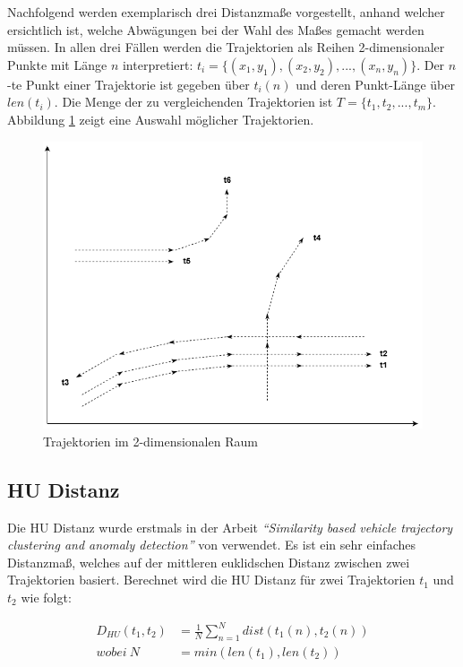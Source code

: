 
Nachfolgend werden exemplarisch drei Distanzmaße vorgestellt, anhand welcher ersichtlich ist, welche Abwägungen
bei der Wahl des Maßes gemacht werden müssen.
In allen drei Fällen werden die Trajektorien als Reihen 2-dimensionaler Punkte mit Länge $n$ interpretiert: $t_i = \{(x_1, y_1), (x_2, y_2), ..., (x_n, y_n)\}$.
Der $n$-te Punkt einer Trajektorie ist gegeben über $t_i(n)$ und deren Punkt-Länge über $len(t_i)$.
Die Menge der zu vergleichenden Trajektorien ist $T = \{t_1, t_2, ..., t_m\}$.
Abbildung \ref{fig:grund_trajectories} zeigt eine Auswahl möglicher Trajektorien.

\begin{figure}[H]
\centering
\includegraphics[width=0.6\linewidth]{resources/img/grundlagen/trajectories}
\caption{Trajektorien im 2-dimensionalen Raum}
\label{fig:grund_trajectories}
\end{figure}

\subsection{HU Distanz}
\label{sec:hu_distance}

Die HU Distanz wurde erstmals in der Arbeit \textit{``Similarity based vehicle trajectory clustering and anomaly detection''}
von \cite[]{Hu2005} verwendet. Es ist ein sehr einfaches Distanzmaß, welches auf der mittleren euklidschen Distanz
zwischen zwei Trajektorien basiert. Berechnet wird die HU Distanz für zwei Trajektorien $t_1$ und $t_2$ wie folgt:

\begin{ceqn}
\begin{align}
\label{eq_hu_distance1}
    D_{HU}(t_1, t_2) &= \frac{1}{N} \sum_{n = 1}^N dist(t_1(n), t_2(n)) \\
\label{eq_hu_distance2}
    wobei\ N &= min(len(t_1), len(t_2))
\end{align}
\end{ceqn}

